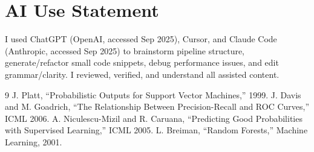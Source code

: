 \documentclass[conference]{IEEEtran}
\begin{document}
\section*{AI Use Statement}
I used ChatGPT (OpenAI, accessed Sep 2025), Cursor, and Claude Code (Anthropic, accessed Sep 2025) to brainstorm pipeline structure, generate/refactor small code snippets, debug performance issues, and edit grammar/clarity. I reviewed, verified, and understand all assisted content.

\begin{thebibliography}{9}
 J. Platt, ``Probabilistic Outputs for Support Vector Machines,'' 1999.
 J. Davis and M. Goadrich, ``The Relationship Between Precision-Recall and ROC Curves,'' ICML 2006.
 A. Niculescu-Mizil and R. Caruana, ``Predicting Good Probabilities with Supervised Learning,'' ICML 2005.
 L. Breiman, ``Random Forests,'' Machine Learning, 2001.
\end{thebibliography}
\end{document}

